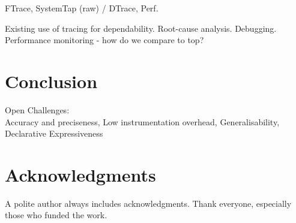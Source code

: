 \documentclass[letterpaper,twocolumn,10pt]{article}
\begin{document}
FTrace, SystemTap (raw) / DTrace, Perf.

Existing use of tracing for dependability.\newline
Root-cause analysis. Debugging. Performance monitoring - how do we compare to
top?

\section{Conclusion}
Open Challenges:\\
Accuracy and preciseness,
Low instrumentation overhead,
Generalisability,
Declarative Expressiveness

\section{Acknowledgments}

A polite author always includes acknowledgments.  Thank everyone,
especially those who funded the work.



{\footnotesize 
}
\end{document}
